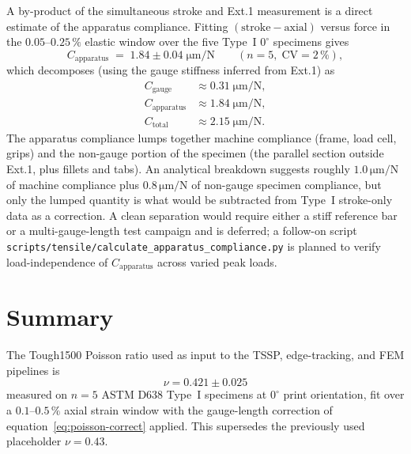 A by-product of the simultaneous stroke and Ext.1 measurement is a direct
estimate of the apparatus compliance. Fitting $(\text{stroke} - \text{axial})$
versus force in the $0.05$--$0.25\,\%$ elastic window over the five Type~I
$0^{\circ}$ specimens gives
%
\begin{equation}
  C_{\text{apparatus}} \;=\; 1.84 \pm 0.04\;\mathrm{\mu m/N}
  \qquad (n = 5,\; \mathrm{CV} = 2\,\%),
  \label{eq:apparatus-compliance}
\end{equation}
%
which decomposes (using the gauge stiffness inferred from Ext.1) as
%
\begin{align}
  C_{\text{gauge}}     &\approx 0.31\;\mathrm{\mu m/N}, \\
  C_{\text{apparatus}} &\approx 1.84\;\mathrm{\mu m/N}, \\
  C_{\text{total}}     &\approx 2.15\;\mathrm{\mu m/N}.
\end{align}
%
The apparatus compliance lumps together machine compliance
(frame, load cell, grips) and the non-gauge portion of the specimen (the
parallel section outside Ext.1, plus fillets and tabs). An analytical
breakdown suggests roughly $1.0\,\mathrm{\mu m/N}$ of machine compliance plus
$0.8\,\mathrm{\mu m/N}$ of non-gauge specimen compliance, but only the lumped
quantity is what would be subtracted from Type~I stroke-only data as a
correction. A clean separation would require either a stiff reference bar or
a multi-gauge-length test campaign and is deferred; a follow-on script
\texttt{scripts/tensile/calculate\_apparatus\_compliance.py} is planned to
verify load-independence of $C_{\text{apparatus}}$ across varied peak loads.

\section{Summary}
\label{sec:poisson-summary}

The Tough1500 Poisson ratio used as input to the TSSP, edge-tracking, and FEM
pipelines is
%
\[
  \boxed{\,\nu = 0.421 \pm 0.025\,}
\]
%
measured on $n = 5$ ASTM D638 Type~I specimens at $0^{\circ}$ print
orientation, fit over a $0.1$--$0.5\,\%$ axial strain window with the
gauge-length correction of equation~\eqref{eq:poisson-correct} applied. This
supersedes the previously used placeholder $\nu = 0.43$.
